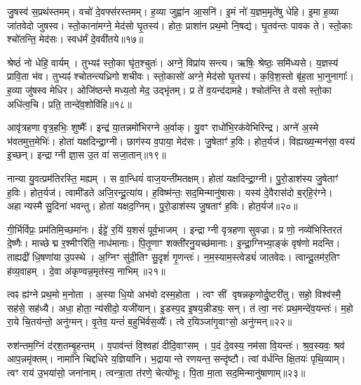 जु॒षस्व॑ स॒प्रथ॑स्तमम्।
वचो॑ दे॒वफ्स॑रस्तमम्।
ह॒व्या जुह्वा॑न आ॒सनि॑।
इ॒मं नो॑ य॒ज्ञम॒मृते॑षु धेहि।
इ॒मा ह॒व्या जा॑तवेदो जुषस्व।
स्तो॒काना॑मग्ने॒ मेद॑सो घृ॒तस्य॑।
होतः॒ प्राशा॑न प्रथ॒मो नि॒षद्य॑।
घृ॒तव॑न्तः पावक ते।
स्तो॒काः श्चो॑तन्ति॒ मेद॑सः।
स्वध॑र्मं दे॒ववी॑तये॥१७॥

श्रेष्ठं॑ नो धेहि॒ वार्यम्।
तुभ्यꣴ॑ स्तो॒का घृ॑त॒श्चुतः॑।
अग्ने॒ विप्रा॑य सन्त्य।
ऋषिः॒ श्रेष्ठः॒ समि॑ध्यसे।
य॒ज्ञस्य॑ प्रावि॒ता भ॑व।
तुभ्यꣴ॑ श्चोतन्त्यध्रिगो शचीवः।
स्तो॒कासो॑ अग्ने॒ मेद॑सो घृ॒तस्य॑।
क॒वि॒श॒स्तो बृ॑ह॒ता भा॒नुनागाः᳚।
ह॒व्या जु॑षस्व मेधिर।
ओजि॑ष्ठन्ते मध्य॒तो मेद॒ उद्भृ॑तम्।
प्र ते॑ व॒यन्द॑दामहे।
श्चोत॑न्ति ते वसो स्तो॒का अधि॑त्व॒चि।
प्रति॒ तान्दे॑व॒शोवि॑हि॥१८॥\anuvakamend[दे॒ववी॑तय॒ उद्भृ॑त॒न्त्रीणि॑ च]

आवृ॑त्रहणा वृत्र॒हभिः॒ शुष्मैः᳚।
इन्द्र॑ या॒तन्नमो॑भिरग्ने अ॒र्वाक्।
यु॒वꣳ राधो॑भि॒रक॑वेभिरिन्द्र।
अग्ने॑ अ॒स्मे भ॑वतमुत्त॒मेभिः॑।
होता॑ यक्षदिन्द्रा॒ग्नी।
छाग॑स्य व॒पाया॒ मेद॑सः।
जु॒षेताꣳ॑ ह॒विः।
होत॒र्यज॑।
विह्यख्य॒न्मन॑सा॒ वस्य॑ इ॒च्छन्।
इन्द्राग्नी ज्ञा॒स उ॒त वा॑ सजा॒तान्॥१९॥

नान्या यु॒वत्प्रम॑तिरस्ति॒ मह्यम्।
स वा॒न्धियं॑ वाज॒यन्ती॑मतक्षम्।
होता॑ यक्षदिन्द्रा॒ग्नी।
पु॒रो॒डाश॑स्य जु॒षेताꣳ॑ ह॒विः।
होत॒र्यज॑।
त्वामी॑डते अजि॒रन्दू॒त्या॑य।
ह॒विष्म॑न्तः॒ सद॒मिन्मानु॑षासः।
यस्य॑ दे॒वैरास॑दो ब॒र्‌\mbox{}हि॒र॑ग्ने।
अहान्यस्मै सु॒दिना॑ भवन्तु।
होता॑ यक्षद॒ग्निम्।
पु॒रो॒डाश॑स्य जु॒षताꣳ॑ ह॒विः।
होत॒र्यज॑॥२०॥\anuvakamend[स॒जा॒तान॒ग्निन्द्वे च॑]

गी॒र्भिर्विप्रः॒ प्रम॑तिमि॒च्छमा॑नः।
ईट्टे॑ र॒यिं य॒शसं॑ पूर्व॒भाजम्।
इन्द्राग्नी वृत्रहणा सुवज्रा।
प्र णो॒ नव्ये॑भिस्तिरतं दे॒ष्णैः।
माच्छेद्म र॒श्मीꣳरिति॒ नाध॑मानाः।
पि॒तृ॒णाꣳ शक्ती॑रनु॒यच्छ॑मानाः।
इ॒न्द्रा॒ग्निभ्या॒ङ्कं वृष॑णो मदन्ति।
ताह्यद्री॑ धि॒षणा॑या उ॒पस्थे।
अ॒ग्निꣳ सु॑दी॒तिꣳ सु॒दृशं॑ गृ॒णन्तः॑।
न॒म॒स्याम॒स्त्वेड्यं॑ जातवेदः।
त्वान्दू॒तम॑र॒तिꣳ ह॑व्य॒वाहम्।
दे॒वा अ॑कृण्वन्न॒मृत॑स्य॒ नाभिम्॥२१॥\anuvakamend[जा॒त॒वे॒दो॒ द्वे च॑]

त्वꣴ ह्य॑ग्ने प्रथ॒मो म॒नोता।
अ॒स्या धि॒यो अभ॑वो दस्म॒होता।
त्वꣳ सीं वृषन्नकृणोर्दु॒ष्टरी॑तु।
सहो॒ विश्व॑स्मै॒ सह॑से॒ सह॑ध्यै।
अधा॒ होता॒ न्य॑सीदो॒ यजी॑यान्।
इ॒डस्प॒द इ॒षय॒न्नीड्यः॒ सन्।
तं त्वा॒ नरः॑ प्रथ॒मन्दे॑व॒यन्तः॑।
म॒हो रा॒ये चि॒तय॑न्तो॒ अनु॑ग्मन्।
वृ॒तेव॒ यन्तं॑ ब॒हुभि॑र्वस॒व्यैः᳚।
त्वे र॒यिञ्जा॑गृ॒वाꣳसो॒ अनु॑ग्मन्॥२२॥

रुश॑न्तम॒ग्निं द॑र्‌\mbox{}श॒तम्बृ॒हन्तम्।
व॒पाव॑न्तं वि॒श्वहा॑ दीदि॒वाꣳसम्।
प॒दं दे॒वस्य॒ नम॑सा वि॒यन्तः॑।
श्र॒व॒स्यवः॒ श्रव॑ आप॒न्नमृ॑क्तम्।
नामा॑नि चिद्दधिरे य॒ज्ञिया॑नि।
भ॒द्रायान्ते रणयन्त॒ सन्दृ॑ष्टौ।
त्वां व॑र्धन्ति क्षि॒तयः॑ पृथि॒व्याम्।
त्वꣳ राय॑ उ॒भया॑सो॒ जना॑नाम्।
त्वन्त्रा॒ता त॑रणे॒ चेत्यो॑भूः।
पि॒ता मा॒ता सद॒मिन्मानु॑षाणाम्॥२३॥

